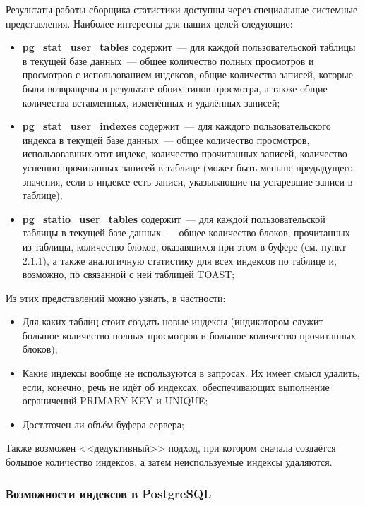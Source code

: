 Результаты работы сборщика статистики доступны через специальные системные представления. Наиболее интересны для наших целей следующие:

\begin{itemize}
  \item \textbf{pg\_stat\_user\_tables} содержит~--- для каждой пользовательской таблицы в текущей базе данных~--- общее количество полных просмотров и просмотров с использованием индексов, общие количества записей, которые были возвращены в результате обоих типов просмотра, а также общие количества вставленных, изменённых и удалённых записей;
  \item \textbf{pg\_stat\_user\_indexes} содержит~--- для каждого пользовательского индекса в текущей базе данных~--- общее количество просмотров, использовавших этот индекс, количество прочитанных записей, количество успешно прочитанных записей в таблице (может быть меньше предыдущего значения, если в индексе есть записи, указывающие на устаревшие записи в таблице);
  \item \textbf{pg\_statio\_user\_tables} содержит~--- для каждой пользовательской таблицы в текущей базе данных~--- общее количество блоков, прочитанных из таблицы, количество блоков, оказавшихся при этом в буфере (см. пункт 2.1.1), а также аналогичную статистику для всех индексов по таблице и, возможно, по связанной с ней таблицей TOAST;
\end{itemize}

Из этих представлений можно узнать, в частности:

\begin{itemize}
 \item Для каких таблиц стоит создать новые индексы (индикатором служит большое количество полных просмотров и большое количество прочитанных блоков);
 \item Какие индексы вообще не используются в запросах. Их имеет смысл удалить, если, конечно, речь не идёт об индексах, обеспечивающих выполнение ограничений PRIMARY KEY и UNIQUE;
 \item Достаточен ли объём буфера сервера;
\end{itemize}

Также возможен <<дедуктивный>> подход, при котором сначала создаётся большое количество индексов, а затем неиспользуемые индексы удаляются.


\subsubsection{Возможности индексов в PostgreSQL}

